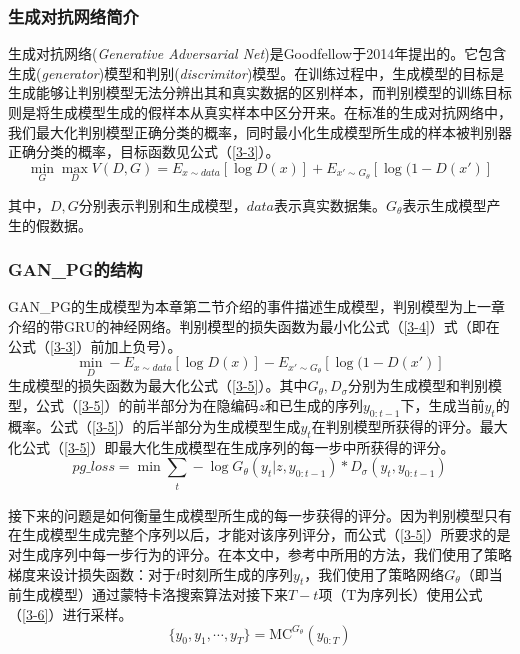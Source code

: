 \subsubsection{生成对抗网络简介}
生成对抗网络(\textit{Generative Adversarial Net}\cite{goodfellow_generative_2014})是Goodfellow于2014年提出的。它包含生成(\textit{generator})模型和判别(\textit{discrimitor})模型。在训练过程中，生成模型的目标是生成能够让判别模型无法分辨出其和真实数据的区别样本，而判别模型的训练目标则是将生成模型生成的假样本从真实样本中区分开来。在标准的生成对抗网络中，我们最大化判别模型正确分类的概率，同时最小化生成模型所生成的样本被判别器正确分类的概率，目标函数见公式（\ref{3-3}）。
\begin{equation}\label{3-3}
    \mathop{min}_G \mathop{max}_D V(D,G)=E_{x\sim data}[\log D(x)]+E_{x'\sim G_\theta}[\log(1-D(x')]
\end{equation}

其中，$D,G$分别表示判别和生成模型，$data$表示真实数据集。$G_\theta$表示生成模型产生的假数据。
\subsubsection{GAN\_PG的结构}
GAN\_PG的生成模型为本章第二节介绍的事件描述生成模型，判别模型为上一章介绍的带GRU的神经网络。判别模型的损失函数为最小化公式（\ref{3-4}）式（即在公式（\ref{3-3}）前加上负号）。
\begin{equation}\label{3-4}
    \mathop{min}_D-E_{x\sim data}[\log D(x)]-E_{x'\sim G_\theta}[\log(1-D(x')]
\end{equation}
生成模型的损失函数为最大化公式（\ref{3-5}）。其中$G_\theta,D_\sigma$分别为生成模型和判别模型，公式（\ref{3-5}）的前半部分为在隐编码$z$和已生成的序列$y_{0:t-1}$下，生成当前$y_t$的概率。公式（\ref{3-5}）的后半部分为生成模型生成$y_t$在判别模型所获得的评分。最大化公式（\ref{3-5}）即最大化生成模型在生成序列的每一步中所获得的评分。
\begin{equation}\label{3-5}
pg\_loss=\mathop{min}\sum_{\substack{t}}-\log G_\theta (y_t|z,y_{0:t-1})*D_\sigma (y_t,y_{0:t-1})
\end{equation}

接下来的问题是如何衡量生成模型所生成的每一步获得的评分。因为判别模型只有在生成模型生成完整个序列以后，才能对该序列评分，而公式（\ref{3-5}）所要求的是对生成序列中每一步行为的评分。在本文中，参考\cite{yu_seqgan:_2016}中所用的方法，我们使用了策略梯度来设计损失函数：对于$t$时刻所生成的序列$y_t$，我们使用了策略网络$G_\theta$（即当前生成模型）通过蒙特卡洛搜索算法对接下来$T-t$项（T为序列长）使用公式（\ref{3-6}）进行采样。
\begin{equation}\label{3-6}
    \{y_0,y_1,\dotsb,y_T\}=\mathrm{MC}^{G_\theta}(y_{0:T})
\end{equation}

